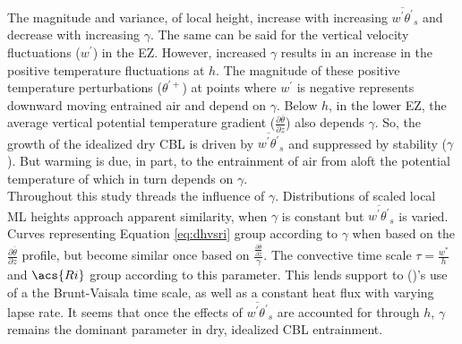 The magnitude and variance, of local height, increase with increasing $\overline{w^{'}\theta^{'}}_{s}$ and decrease with increasing $\gamma$.  The same can be said for the vertical velocity fluctuations ($w^{'}$) in the \acs{EZ}.  However, increased $\gamma$ results in an increase in the positive temperature fluctuations at $h$. The magnitude of these positive temperature perturbations ($\theta^{'+}$) at points where $w^{'}$ is negative represents downward moving entrained air and depend on $\gamma$.  Below $h$, in the lower \acs{EZ}, the average vertical potential temperature gradient ($\frac{\partial \overline{\theta}}{\partial z}$) also depends $\gamma$. So, the growth of the idealized dry \acs{CBL} is driven by $\overline{w^{'}\theta^{'}}_{s}$ and suppressed by stability ($\gamma$). But warming is due, in part, to the entrainment of air from aloft the potential temperature of which in turn depends on $\gamma$.\\

Throughout this study threads the influence of $\gamma$.  Distributions of scaled local \acs{ML} heights approach apparent similarity, when $\gamma$ is constant but $\overline{w^{'}\theta^{'}}_{s}$ is varied.  Curves representing Equation \ref{eq:dhvsri} group according to $\gamma$ when based on the $\frac{\partial \overline{\theta}}{\partial z}$ profile, but become similar once based on $\frac{\frac{\partial \overline{\theta}}{\partial z}}{\gamma}$.  The convective time scale $\tau = \frac{w^{*}}{h}$ and $\acs{Ri}$ group according to this parameter.  This lends support to \citeauthor{FedConzMir04} (\citeyear{FedConzMir04})'s use of a the Brunt-Vaisala time scale, as well as a constant heat flux with varying lapse rate.  It seems that once the effects of $\overline{w^{'}\theta^{'}}_{s}$ are accounted for through $h$, $\gamma$ remains the dominant parameter in dry, idealized \acs{CBL} entrainment.\\ 

\FloatBarrier


\endinput

Any text after an \endinput is ignored.
You could put scraps here or things in progress.
